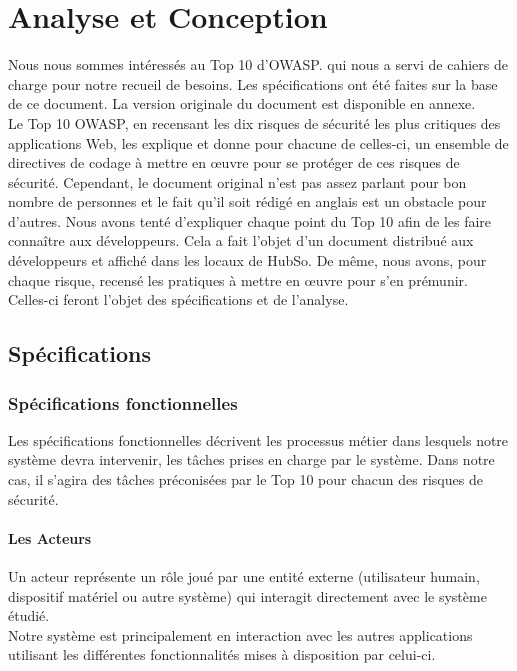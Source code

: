 \chapter{Analyse et Conception}
\minitoc
\clearpage
Nous nous sommes intéressés au Top 10 d'OWASP. qui nous a servi de cahiers de charge pour notre recueil de besoins. Les spécifications ont été faites sur la base de ce document. La version originale du document est disponible en annexe.\\
Le Top 10 OWASP, en recensant les dix risques de sécurité les plus critiques des applications Web, les explique et donne pour chacune de celles-ci, un ensemble de directives de codage à mettre en œuvre pour se protéger de ces risques de sécurité. Cependant, le document original n'est pas assez parlant pour bon nombre de personnes et le fait qu'il soit rédigé en anglais est un obstacle pour d'autres. Nous avons tenté d'expliquer chaque point du Top 10 afin de les faire connaître aux développeurs. Cela a fait l'objet d'un document distribué aux développeurs et affiché dans les locaux de HubSo. De même, nous avons, pour chaque risque, recensé les pratiques à mettre en œuvre pour s'en prémunir. Celles-ci feront l'objet des spécifications et de l'analyse.

\section{Spécifications}

\subsection{Spécifications fonctionnelles}
Les spécifications fonctionnelles décrivent les processus métier dans lesquels notre système devra intervenir, les tâches prises en charge par le système. Dans notre cas, il s'agira des tâches préconisées par le Top 10 pour chacun des risques de sécurité. 

\subsubsection{Les Acteurs}
Un acteur représente un rôle joué par une entité externe (utilisateur humain, dispositif matériel ou autre système) qui interagit directement avec le système étudié.\\
Notre système est principalement en interaction avec les autres applications utilisant les différentes fonctionnalités mises à disposition par celui-ci. 

